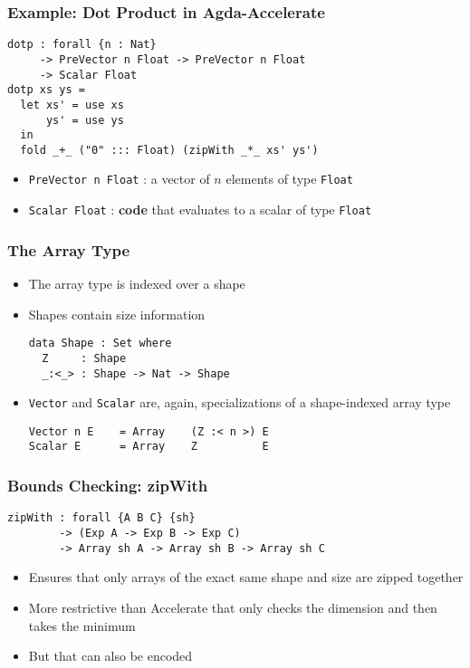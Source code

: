 \documentclass{beamer}
\begin{document}
\begin{frame}[fragile]
  \frametitle{Example: Dot Product in Agda-Accelerate}
  \vspace{-\baselineskip}
\begin{verbatim}
dotp : forall {n : Nat}
     -> PreVector n Float -> PreVector n Float
     -> Scalar Float
dotp xs ys = 
  let xs' = use xs
      ys' = use ys
  in
  fold _+_ ("0" ::: Float) (zipWith _*_ xs' ys')
\end{verbatim}
  \begin{itemize}
  \item \texttt{PreVector n Float} : a vector of $n$ elements of
    type \texttt{Float}
  \item \texttt{Scalar Float} : \textbf{code} that evaluates to a scalar of type \texttt{Float}
  \end{itemize}
\end{frame}
\begin{frame}[fragile]
  \frametitle{The Array Type}
  \begin{itemize}
  \item The array type is indexed over a shape
  \item Shapes contain size information
\begin{verbatim}
data Shape : Set where
  Z     : Shape
  _:<_> : Shape -> Nat -> Shape
\end{verbatim}
  \item \texttt{Vector} and \texttt{Scalar} are, again,
    specializations of a shape-indexed array type
\begin{verbatim}
Vector n E    = Array    (Z :< n >) E
Scalar E      = Array    Z          E
\end{verbatim}
  \end{itemize}
\end{frame}
\begin{frame}[fragile]
  \frametitle{Bounds Checking: zipWith}
\begin{verbatim}
zipWith : forall {A B C} {sh}
        -> (Exp A -> Exp B -> Exp C)
        -> Array sh A -> Array sh B -> Array sh C
\end{verbatim}
  \begin{itemize}
  \item Ensures that only arrays of the exact same shape and size are
    zipped together
  \item More restrictive than Accelerate that only checks the
    dimension and then takes the minimum
  \item But that can also be encoded
  \end{itemize}
\end{frame}
\end{document}
